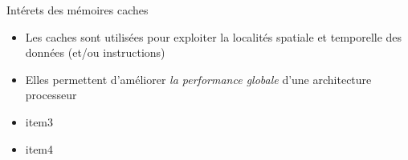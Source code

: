 %
\begin{Frame}{Intérets des mémoires caches}
      \begin{block}{}
        \begin{itemize}
        \item Les caches sont utilisées pour exploiter la localités spatiale et temporelle des données (et/ou instructions)
        \item Elles permettent d'améliorer \emph{la performance globale} d'une architecture processeur
        \item item3
        \item item4
        \end{itemize}
      \end{block} 
      
\end{Frame}


